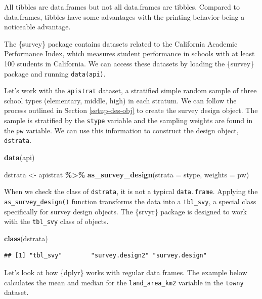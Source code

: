 \documentclass[
]{krantz}
\makeatletter
\newenvironment{Shaded}{\begin{snugshade}}{\end{snugshade}}
\newcommand{\AttributeTok}[1]{\textcolor[rgb]{0.27,0.27,0.27}{#1}}
\newcommand{\FunctionTok}[1]{\textcolor[rgb]{0.27,0.27,0.27}{\textbf{#1}}}
\newcommand{\NormalTok}[1]{#1}
\newcommand{\OtherTok}[1]{\textcolor[rgb]{0.37,0.37,0.37}{#1}}
\newcommand{\SpecialCharTok}[1]{\textcolor[rgb]{0.43,0.43,0.43}{\textbf{#1}}}
\newenvironment{kframe}{%
\medskip{}
\setlength{\fboxsep}{.8em}
 \def\at@end@of@kframe{}%
 \ifinner\ifhmode%
  \def\at@end@of@kframe{\end{minipage}}%
  \begin{minipage}{\columnwidth}%
 \fi\fi%
 \def\FrameCommand##1{\hskip\@totalleftmargin \hskip-\fboxsep
 \colorbox{shadecolor}{##1}\hskip-\fboxsep
     \hskip-\linewidth \hskip-\@totalleftmargin \hskip\columnwidth}%
 \MakeFramed {\advance\hsize-\width
   \@totalleftmargin\z@ \linewidth\hsize
   \@setminipage}}%
 {\par\unskip\endMakeFramed%
 \at@end@of@kframe}
\renewenvironment{Shaded}{\begin{kframe}}{\end{kframe}}
\makeatother
\begin{document}
All tibbles are data.frames but not all data.frames are tibbles. Compared to data.frames, tibbles have some advantages with the printing behavior being a noticeable advantage.

The \{survey\} package contains datasets related to the California Academic Performance Index, which measures student performance in schools with at least 100 students in California. We can access these datasets by loading the \{survey\} package and running \texttt{data(api)}.

Let's work with the \texttt{apistrat} dataset, a stratified simple random sample of three school types (elementary, middle, high) in each stratum. We can follow the process outlined in Section \ref{setup-des-obj} to create the survey design object. The sample is stratified by the \texttt{stype} variable and the sampling weights are found in the \texttt{pw} variable. We can use this information to construct the design object, \texttt{dstrata}.

\begin{Shaded}
\begin{Highlighting}[]
\FunctionTok{data}\NormalTok{(api)}

\NormalTok{dstrata }\OtherTok{\textless{}{-}}\NormalTok{ apistrat }\SpecialCharTok{\%\textgreater{}\%}
  \FunctionTok{as\_survey\_design}\NormalTok{(}\AttributeTok{strata =}\NormalTok{ stype, }\AttributeTok{weights =}\NormalTok{ pw)}
\end{Highlighting}
\end{Shaded}

When we check the class of \texttt{dstrata}, it is not a typical \texttt{data.frame}. Applying the \texttt{as\_survey\_design()} function transforms the data into a \texttt{tbl\_svy}, a special class specifically for survey design objects. The \{srvyr\} package is designed to work with the \texttt{tbl\_svy} class of objects.

\begin{Shaded}
\begin{Highlighting}[]
\FunctionTok{class}\NormalTok{(dstrata)}
\end{Highlighting}
\end{Shaded}

\begin{verbatim}
## [1] "tbl_svy"        "survey.design2" "survey.design"
\end{verbatim}

Let's look at how \{dplyr\} works with regular data frames. The example below calculates the mean and median for the \texttt{land\_area\_km2} variable in the \texttt{towny} dataset.
\end{document}
